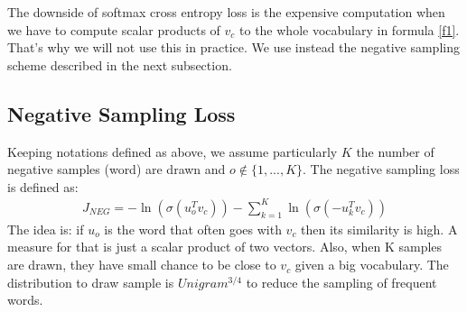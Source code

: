 \documentclass[12pt,oneside,a4paper]{book}
\theoremstyle{break}
\begin{document}
The downside of softmax cross entropy loss is the expensive computation when we have to compute scalar products of $v_c$ to the whole vocabulary in formula \ref{f1}. That's why we will not use this in practice. We use instead the negative sampling scheme described in the next subsection.
\subsection{Negative Sampling Loss}
Keeping notations defined as above, we assume particularly $K$ the number of negative samples (word) are drawn and $o \notin \{1,...,K\}$. The negative sampling loss is defined as:
\begin{align}
J_{NEG} = -\ln(\sigma(u_o^T v_c)) - \sum_{k=1}^K \ln(\sigma(-u_k^T v_c))
\end{align}
The idea is: if $u_o$ is the word that often goes with $v_c$ then its similarity is high. A measure for that is just a scalar product of two vectors. Also, when K samples are drawn, they have small chance to be close to $v_c$ given a big vocabulary. The distribution to draw sample is $Unigram^{3/4}$ to reduce the sampling of frequent words.

% 

% 

% 

\end{document}
